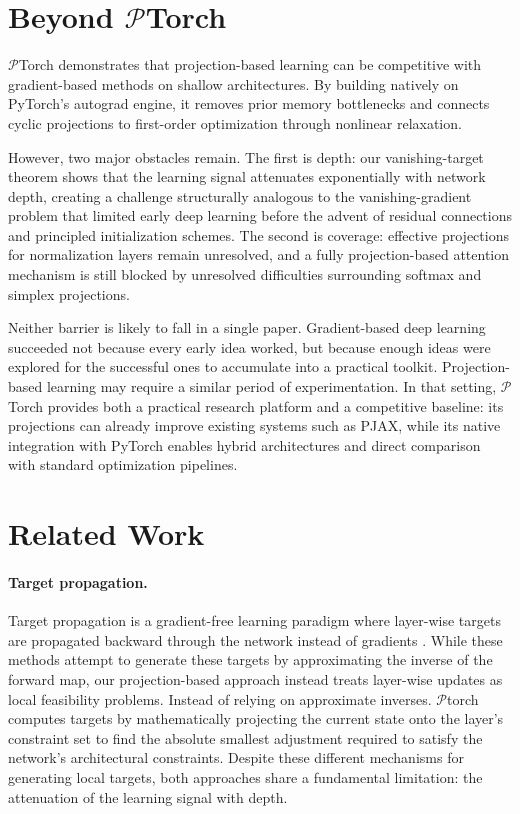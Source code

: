 \documentclass{article}
\begin{document}
\section{Beyond $\mathcal{P}$Torch}
$\mathcal{P}$Torch demonstrates that projection-based learning can be competitive with gradient-based methods on shallow architectures. By building natively on PyTorch's autograd engine, it removes prior memory bottlenecks and connects cyclic projections to first-order optimization through nonlinear relaxation.

However, two major obstacles remain. The first is depth: our vanishing-target theorem shows that the learning signal attenuates exponentially with network depth, creating a challenge structurally analogous to the vanishing-gradient problem that limited early deep learning before the advent of residual connections and principled initialization schemes. The second is coverage: effective projections for normalization layers remain unresolved, and a fully projection-based attention mechanism is still blocked by unresolved difficulties surrounding softmax and simplex projections.

Neither barrier is likely to fall in a single paper. Gradient-based deep learning succeeded not because every early idea worked, but because enough ideas were explored for the successful ones to accumulate into a practical toolkit. Projection-based learning may require a similar period of experimentation. In that setting, $\mathcal{P}$Torch provides both a practical research platform and a competitive baseline: its projections can already improve existing systems such as PJAX, while its native integration with PyTorch enables hybrid architectures and direct comparison with standard optimization pipelines.
\printbibliography


\newpage
\appendix
{}

\section{Related Work}

\paragraph{Target propagation.}
Target propagation is a  gradient-free learning paradigm where layer-wise targets are propagated backward through the network instead of gradients \cite{lee2015difference}. While these methods attempt to generate these targets by approximating the inverse of the forward map, our projection-based approach instead treats layer-wise updates as local feasibility problems. Instead of relying on approximate inverses. $\mathcal{P}$torch computes targets by mathematically projecting the current state onto the layer's constraint set to find the absolute smallest adjustment required to satisfy the network's architectural constraints. Despite these different mechanisms for generating local targets, both approaches share a fundamental limitation: the attenuation of the learning signal with depth. 
\end{document}
